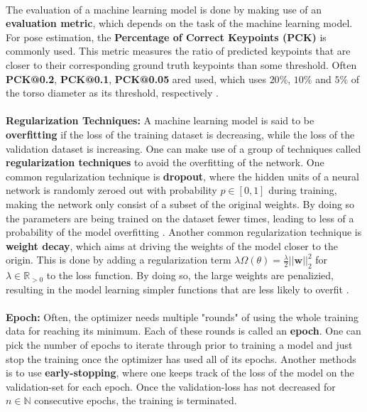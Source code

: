 \documentclass[./main.tex]{subfiles}
\begin{document}
\\
The evaluation of a machine learning model is done by making use of an \textbf{evaluation metric}, which depends on the task of the machine learning model. For pose estimation, the \textbf{Percentage of Correct Keypoints (PCK)} is commonly used. This metric measures the ratio of predicted keypoints that are closer to their corresponding ground truth keypoints than some threshold. Often \textbf{PCK@0.2}, \textbf{PCK@0.1}, \textbf{PCK@0.05} ared used, which uses $20\%$, $10\%$ and $5\%$ of the torso diameter as its threshold, respectively \cite{https://doi.org/10.48550/arxiv.2001.08095}.
\\
\\
\noindent \textbf{Regularization Techniques:} A machine learning model is said to be \textbf{overfitting} if the loss of the training dataset is decreasing, while the loss of the validation dataset is increasing. One can make use of a group of techniques called \textbf{regularization techniques} to avoid the overfitting of the network. One common regularization technique is \textbf{dropout}, where the hidden units of a neural network is randomly zeroed out with probability $p \in [0, 1]$ during training, making the network only consist of a subset of the original weights. By doing so the parameters are being trained on the dataset fewer times, leading to less of a probability of the model overfitting \cite{d2l}. Another common regularization technique is \textbf{weight decay}, which aims at driving the weights of the model closer to the origin. This is done by adding a regularization term $\lambda \Omega(\theta) = \frac{\lambda}{2} || \bm{w} ||^2 _2$ for $\lambda \in \mathbb{R}_{> 0}$ to the loss function. By doing so, the large weights are penalizied, resulting in the model learning simpler functions that are less likely to overfit \cite{DL_book}.
\\
\\
\noindent \textbf{Epoch:} Often, the optimizer needs multiple "rounds" of using the whole training data for reaching its minimum. Each of these rounds is called an \textbf{epoch}. One can pick the number of epochs to iterate through prior to training a model and just stop the training once the optimizer has used all of its epochs. Another methods is to use \textbf{early-stopping}, where one keeps track of the loss of the model on the validation-set for each epoch. Once the validation-loss has not decreased for $n \in \mathbb{N}$ consecutive epochs, the training is terminated.
\end{document}
